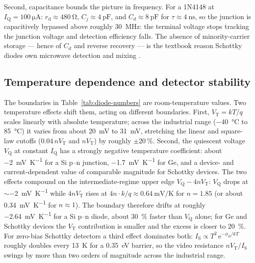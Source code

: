 \documentclass[12pt]{article}
\newcommand{\IS}{I_{\mathrm{S}}}
\newcommand{\VT}{V_{\mathrm{T}}}
\newcommand{\VQ}{V_{\mathrm{Q}}}
\newcommand{\IQ}{I_{\mathrm{Q}}}
\newcommand{\rd}{r_{\mathrm{d}}}
\newcommand{\eu}{\mathrm{e}}        %
\begin{document}
Second, capacitance bounds the picture in frequency. For a 1N4148 at $\IQ = \SI{100}{\micro\ampere}$: $\rd \approx \SI{480}{\ohm}$, $C_j \approx \SI{4}{\pico\farad}$, and $C_d \approx \SI{8}{\pico\farad}$ for $\tau \approx \SI{4}{\nano\second}$, so the junction is capacitively bypassed above roughly \SI{30}{\mega\hertz}: the terminal voltage stops tracking the junction voltage and detection efficiency falls. The absence of minority-carrier storage --- hence of $C_d$ and reverse recovery --- is the textbook reason Schottky diodes own microwave detection and mixing \cite{sze,maas}.

\subsection*{Temperature dependence and detector stability}

The boundaries in Table~\ref{tab:diode-numbers} are room-temperature values. Two temperature effects shift them, acting on different boundaries. First, $\VT = kT/q$ scales linearly with absolute temperature; across the industrial range (\SI{-40}{\degreeCelsius} to \SI{85}{\degreeCelsius}) it varies from about \SI{20}{\milli\volt} to \SI{31}{\milli\volt}, stretching the linear and square-law cutoffs ($0.04\,n\VT$ and $n\VT$) by roughly $\pm\SI{20}{\percent}$. Second, the quiescent voltage $\VQ$ at constant $\IQ$ has a strongly negative temperature coefficient: about \SI{-2}{\milli\volt\per\kelvin} for a Si p--n junction, \SI{-1.7}{\milli\volt\per\kelvin} for Ge, and a device- and current-dependent value of comparable magnitude for Schottky devices. The two effects compound on the intermediate-regime upper edge $\VQ - 4n\VT$: $\VQ$ drops at $\sim$\SI{-2}{\milli\volt\per\kelvin} while $4n\VT$ rises at $4n\cdot k/q \approx \SI{+0.64}{\milli\volt\per\kelvin}$ for $n=1.85$ (or about \SI{+0.34}{\milli\volt\per\kelvin} for $n\approx 1$). The boundary therefore drifts at roughly \SI{-2.64}{\milli\volt\per\kelvin} for a Si p--n diode, about \SI{30}{\percent} faster than $\VQ$ alone; for Ge and Schottky devices the $\VT$ contribution is smaller and the excess is closer to \SI{20}{\percent}. For zero-bias Schottky detectors a third effect dominates both: $\IS \propto T^2\, \eu^{-\phi_B/kT}$ roughly doubles every \SI{13}{\kelvin} for a \SI{0.35}{\electronvolt} barrier, so the video resistance $n\VT/\IS$ swings by more than two orders of magnitude across the industrial range.
\end{document}
